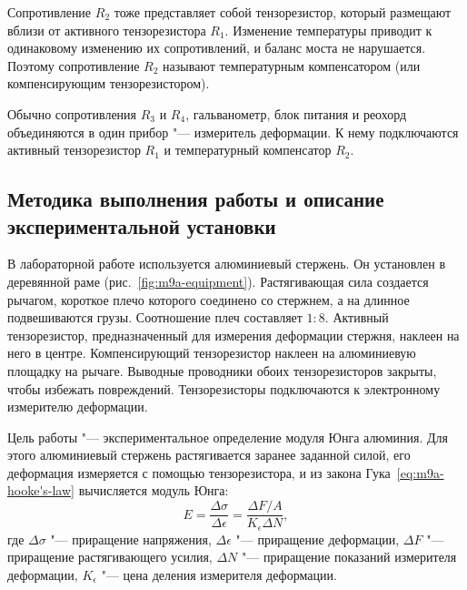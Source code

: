 \documentclass[a4paper, 12pt]{extarticle}
\newcommand{\eps}{\epsilon}
\begin{document}
Сопротивление $R_2$ тоже представляет собой тензорезистор, который размещают вблизи от активного тензорезистора $R_1$. Изменение температуры приводит к одинаковому изменению их сопротивлений, и баланс моста не нарушается. Поэтому сопротивление $R_2$ называют температурным компенсатором (или компенсирующим тензорезистором).

Обычно сопротивления $R_3$ и $R_4$, гальванометр, блок питания и реохорд объединяются в один прибор "--- измеритель деформации. К нему подключаются активный тензорезистор $R_1$ и температурный компенсатор $R_2$. 

\begin{figure}[h]
\begin{center}
\end{center}
\caption{\label{fig:m9a-scheme}}
\end{figure}


\subsection{Методика выполнения работы и описание экспериментальной установки}
В лабораторной работе используется алюминиевый стержень. Он установлен в деревянной раме (рис.~\ref{fig:m9a-equipment}). Растягивающая сила создается рычагом, короткое плечо которого соединено со стержнем, а на длинное подвешиваются грузы. Соотношение плеч составляет $1:8$. Активный тензорезистор, предназначенный для измерения деформации стержня, наклеен на него в центре. Компенсирующий тензорезистор наклеен на алюминиевую площадку на рычаге. Выводные проводники обоих тензорезисторов закрыты, чтобы избежать повреждений. Тензорезисторы подключаются к электронному измерителю деформации. 

Цель работы "--- экспериментальное определение модуля Юнга алюминия. Для этого алюминиевый стержень растягивается заранее заданной силой, его деформация измеряется с помощью тензорезистора, и из закона Гука~\eqref{eq:m9a-hooke's-law} вычисляется модуль Юнга: 
\begin{equation}
\label{eq:m9a-young's-modulus}
E = \frac{\Delta \sigma}{\Delta \eps} = \frac{\Delta F / A}{K_\eps \Delta N},
\end{equation}
где $\Delta \sigma$ "--- приращение напряжения, $\Delta \eps$ "--- приращение деформации, $\Delta F$ "--- приращение растягивающего усилия, $\Delta N$  "--- приращение показаний измерителя деформации, $K_\eps$ "--- цена деления измерителя деформации. 
\end{document}
